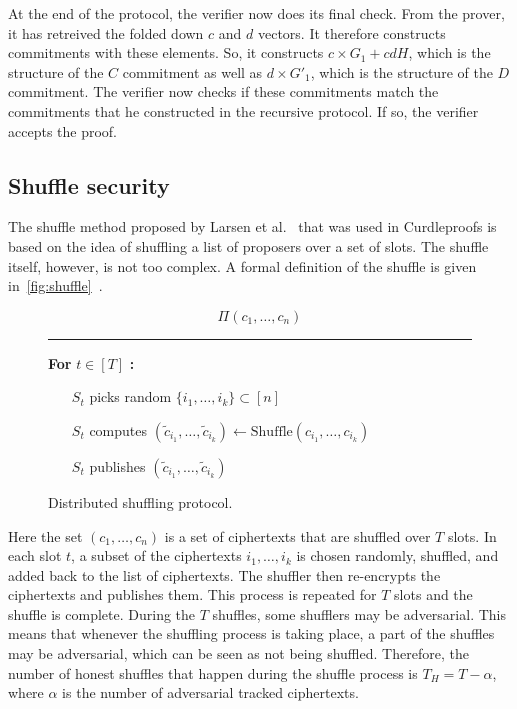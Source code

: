 At the end of the protocol, the verifier now does its final check.
From the prover, it has retreived the folded down $c$ and $d$ vectors.
It therefore constructs commitments with these elements.
So, it constructs $c\times G_1+cdH$, which is the structure of the $C$ commitment as well as $d\times G'_1$, which is the structure of the $D$ commitment.
The verifier now checks if these commitments match the commitments that he constructed in the recursive protocol.
If so, the verifier accepts the proof.


\subsection{Shuffle security}\label{subsec:approach-shuffle-security}
The shuffle method proposed by Larsen et al.~\cite{cryptoeprint:2022/560} that was used in Curdleproofs is based on the idea of shuffling a list of proposers over a set of slots.
The shuffle itself, however, is not too complex.
A formal definition of the shuffle is given in~\autoref{fig:shuffle}~\cite{cryptoeprint:2022/560}.

\begin{figure}[ht]
\begin{framed}
    \[
        \Pi(c_1, \ldots, c_n)
    \]
    \rule{\linewidth}{0.4pt}

    \noindent
    \textbf{For} $t \in [T]$ \textbf{:}
    \begin{itemize}
        \item[$S_t$] picks random $\{i_1, \ldots, i_k\} \subset [n]$
        \item[$S_t$] computes $(\tilde{c}_{i_1}, \ldots, \tilde{c}_{i_k}) \leftarrow \text{Shuffle}(c_{i_1}, \ldots, c_{i_k})$
        \item[$S_t$] publishes $(\tilde{c}_{i_1}, \ldots, \tilde{c}_{i_k})$
    \end{itemize}
\end{framed}
\caption{Distributed shuffling protocol.}
\label{fig:shuffle}
\end{figure}

Here the set $(c_1, \ldots, c_n)$ is a set of ciphertexts that are shuffled over $T$ slots.
In each slot $t$, a subset of the ciphertexts ${i_1, \ldots, i_k}$ is chosen randomly, shuffled, and added back to the list of ciphertexts.
The shuffler then re-encrypts the ciphertexts and publishes them.
This process is repeated for $T$ slots and the shuffle is complete.
During the $T$ shuffles, some shufflers may be adversarial.
This means that whenever the shuffling process is taking place, a part of the shuffles may be adversarial, which can be seen as not being shuffled.
Therefore, the number of honest shuffles that happen during the shuffle process is $T_H = T - \alpha$, where $\alpha$ is the number of adversarial tracked ciphertexts.


